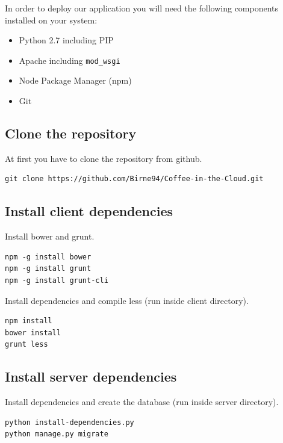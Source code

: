 In order to deploy our application you will need the following
components installed on your system:

\begin{itemize}
\item
  Python 2.7 including PIP
\item
  Apache including \texttt{mod\_wsgi}
\item
  Node Package Manager (npm)
\item
  Git
\end{itemize}

\subsection{Clone the repository}\label{clone-the-repository}

At first you have to clone the repository from github.

\begin{verbatim}
git clone https://github.com/Birne94/Coffee-in-the-Cloud.git
\end{verbatim}

\subsection{Install client
dependencies}\label{install-client-dependencies}

Install bower and grunt.

\begin{verbatim}
npm -g install bower
npm -g install grunt
npm -g install grunt-cli
\end{verbatim}

Install dependencies and compile less (run inside client directory).

\begin{verbatim}
npm install
bower install
grunt less
\end{verbatim}

\subsection{Install server
dependencies}\label{install-server-dependencies}

Install dependencies and create the database (run inside server
directory).

\begin{verbatim}
python install-dependencies.py
python manage.py migrate
\end{verbatim}

